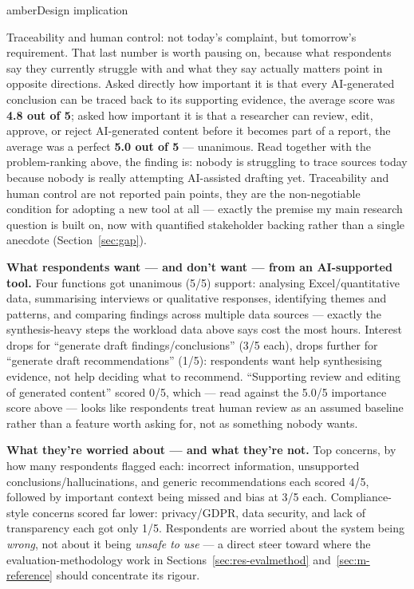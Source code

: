 \begin{calloutbox}{amber}{Design implication}

Traceability and human control: not today's complaint, but tomorrow's requirement. That last number is worth pausing on, because what respondents say they currently struggle with and what they say actually matters point in opposite directions. Asked directly how important it is that every AI-generated conclusion can be traced back to its supporting evidence, the average score was \textbf{4.8 out of 5}; asked how important it is that a researcher can review, edit, approve, or reject AI-generated content before it becomes part of a report, the average was a perfect \textbf{5.0 out of 5} — unanimous. Read together with the problem-ranking above, the finding is: nobody is struggling to trace sources today because nobody is really attempting AI-assisted drafting yet. Traceability and human control are not reported pain points, they are the non-negotiable condition for adopting a new tool at all — exactly the premise my main research question is built on, now with quantified stakeholder backing rather than a single anecdote (Section~\ref{sec:gap}).

\end{calloutbox}

\textbf{What respondents want — and don't want — from an AI-supported tool.} Four functions got unanimous (5/5) support: analysing Excel/quantitative data, summarising interviews or qualitative responses, identifying themes and patterns, and comparing findings across multiple data sources — exactly the synthesis-heavy steps the workload data above says cost the most hours. Interest drops for \textquotedblleft{}generate draft findings/conclusions\textquotedblright{} (3/5 each), drops further for \textquotedblleft{}generate draft recommendations\textquotedblright{} (1/5): respondents want help synthesising evidence, not help deciding what to recommend. \textquotedblleft{}Supporting review and editing of generated content\textquotedblright{} scored 0/5, which — read against the 5.0/5 importance score above — looks like respondents treat human review as an assumed baseline rather than a feature worth asking for, not as something nobody wants.



\textbf{What they're worried about — and what they're not.} Top concerns, by how many respondents flagged each: incorrect information, unsupported conclusions/hallucinations, and generic recommendations each scored 4/5, followed by important context being missed and bias at 3/5 each. Compliance-style concerns scored far lower: privacy/GDPR, data security, and lack of transparency each got only 1/5. Respondents are worried about the system being \textit{wrong}, not about it being \textit{unsafe to use} — a direct steer toward where the evaluation-methodology work in Sections~\ref{sec:res-evalmethod} and~\ref{sec:m-reference} should concentrate its rigour.



